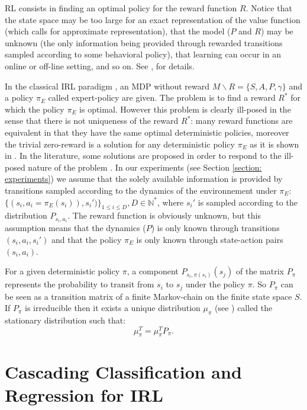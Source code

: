 \documentclass[11pt]{article}
\newcommand{\0}{\mathbf{0}}
\newcommand{\1}{\mathbf{1}}
\begin{document}
RL consists in finding an optimal policy for the reward function $R$. Notice that the state space may be too large for an exact representation of the value function (which calls for approximate
representation), that the model ($P$ and $R$) may be unknown (the only information being provided through rewarded transitions sampled according
to some behavioral policy), that learning can occur in an online or off-line setting, and so on. See \cite{bertsekas2001dynamic},\cite{sutton1998reinforcement} for details.

In the classical IRL paradigm \cite{ng2000algorithms}, an MDP without reward $M\backslash R =\{S,A,P,\gamma\}$ and a policy $\pi_E$ called expert-policy are given. The problem is to find
a reward $R^*$ for which the policy $\pi_E$ is optimal. However this problem is clearly ill-posed in the sense that there is not uniqueness of the reward $R^*$: many reward functions are equivalent in that they have the same optimal deterministic policies, moreover the trivial zero-reward is a solution for any deterministic policy $\pi_E$ as it is shown in \cite{ng2000algorithms}. In the literature, some solutions are proposed in order to respond to the ill-posed nature of the problem \cite{ng2000algorithms,ziebart2008maximum,boularias2011relative}.
In our experiments (see Section \ref{section: experiments}) we assume that the solely available information is provided by transitions sampled according to the dynamics of the environnement under $\pi_E$: $\{(s_i,a_i=\pi_E(s_i)),s_i')\}_{1\leq i \leq D}, D\in\mathbb{N}^*$,
where $s_i'$ is sampled according to the distribution $P_{s_i,a_i}$.
The reward function is obviously unknown, but this assumption means that the dynamics ($P$) is only known through transitions $(s_i, a_i, s_i')$ and that the
policy $\pi_E$ is only known through state-action pairs $(s_i, a_i)$.

For a given deterministic policy $\pi$, a component $P_{s_i,\pi(s_i)}(s_j)$ of the matrix $P_\pi$ represents the probability to transit from $s_i$ to $s_j$ under the policy $\pi$. So $P_\pi$ can be seen as a transition matrix of a finite Markov-chain on the finite state space $S$. If $P_\pi$ is irreducible then it exists a unique distribution $\mu_\pi$ (see \cite{baldi2000martingales}) called the stationary distribution such that:
\begin{equation}
\label{equation: stationarity}
\mu_\pi^T=\mu_\pi^T P_\pi.
\end{equation}
\label{section: background}
\section{Cascading Classification and Regression for IRL}
\label{sec-3}
\end{document}
